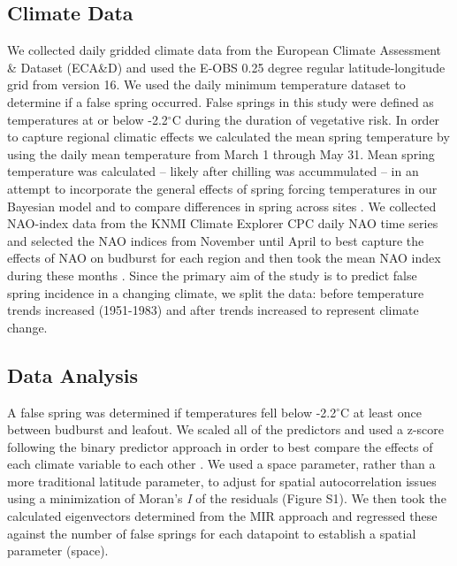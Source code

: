 \documentclass{article}\usepackage[]{graphicx}\usepackage[]{color}
\begin{document}
\subsection*{Climate Data}
We collected daily gridded climate data from the European Climate Assessment \& Dataset (ECA\&D) and used the E-OBS 0.25 degree regular latitude-longitude grid from version 16. We used the daily minimum temperature dataset to determine if a false spring occurred. False springs in this study were defined as temperatures at or below -2.2$^{\circ}$C \citep{Schwartz1993} during the duration of vegetative risk. In order to capture regional climatic effects we calculated the mean spring temperature by using the daily mean temperature from March 1 through May 31. Mean spring temperature was calculated -- likely after chilling was accummulated -- in an attempt to incorporate the general effects of spring forcing temperatures in our Bayesian model and to compare differences in spring across sites \citep{Basler2012, Korner2016}. We collected NAO-index data from the KNMI Climate Explorer CPC daily NAO time series and selected the NAO indices from November until April to best capture the effects of NAO on budburst for each region and then took the mean NAO index during these months \citep{NAOdata}. Since the primary aim of the study is to predict false spring incidence in a changing climate, we split the data: before temperature trends increased (1951-1983) and after trends increased \citep[1984-2016,][]{Kharouba2018, Stocker2013} to represent climate change.

\subsection*{Data Analysis}
A false spring was determined if temperatures fell below -2.2$^{\circ}$C at least once between budburst and leafout. We scaled all of the predictors and used a z-score following the binary predictor approach in order to best compare the effects of each climate variable to each other \citep{Gelman2006}. We used a space parameter, rather than a more traditional latitude parameter, to adjust for spatial autocorrelation issues using a minimization of Moran's \textit{I} of the residuals \citep{Baumen2017} (Figure S1). We then took the calculated eigenvectors determined from the MIR approach and regressed these against the number of false springs for each datapoint to establish a spatial parameter (space). %
\end{document}
